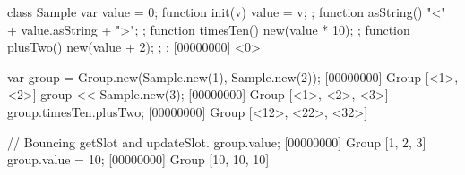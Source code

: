 \begin{urbiscript}
class Sample
{
  var value = 0;
  function init(v) { value = v; };
  function asString() { "<" + value.asString + ">"; };
  function timesTen() { new(value * 10); };
  function plusTwo()  { new(value + 2); };
};
[00000000] <0>

var group = Group.new(Sample.new(1), Sample.new(2));
[00000000] Group [<1>, <2>]
group << Sample.new(3);
[00000000] Group [<1>, <2>, <3>]
group.timesTen.plusTwo;
[00000000] Group [<12>, <22>, <32>]

// Bouncing getSlot and updateSlot.
group.value;
[00000000] Group [1, 2, 3]
group.value = 10;
[00000000] Group [10, 10, 10]
\end{urbiscript}

